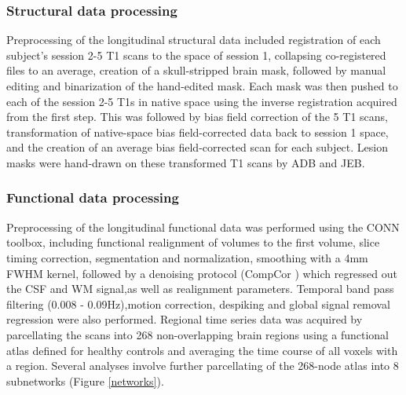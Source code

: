 \documentclass[10pt]{article}
\begin{document}
	\subsubsection*{Structural data processing}
	Preprocessing of the longitudinal structural data included registration of each subject’s session 2-5 T1 scans to the space of session 1, collapsing co-registered files to an average, creation of a skull-stripped brain mask, followed by manual editing and binarization of the hand-edited mask. Each mask was then pushed to each of the session 2-5 T1s in native space using the inverse registration acquired from the first step. This was followed by bias field correction of the 5 T1 scans, transformation of native-space bias field-corrected data back to session 1 space, and the creation of an average bias field-corrected scan for each subject. Lesion masks were hand-drawn on these transformed T1 scans by ADB and JEB.
	
	\subsubsection*{Functional data processing}
	Preprocessing of the longitudinal functional data was performed using the CONN toolbox, including functional realignment of volumes to the first volume, slice timing correction, segmentation and normalization, smoothing with a 4mm FWHM kernel, followed by a denoising protocol (CompCor \cite{Behzadi2007-zt}) which regressed out the CSF and WM signal,as well as realignment parameters. Temporal band pass filtering (0.008 - 0.09Hz),motion correction, despiking and global signal removal regression were also performed.  Regional time series data was acquired by parcellating the scans into 268 non-overlapping brain regions using a functional atlas defined for healthy controls \cite{Shen2013-zn} and averaging the time course of all voxels with a region.  Several analyses involve further parcellating of the 268-node atlas into 8 subnetworks \cite{Finn2015-er} (Figure \ref{networks}).
	
	
\end{document}
